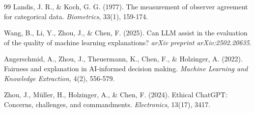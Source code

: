 \documentclass[sigconf,screen]{acmart}
\begin{document}
\begin{thebibliography}{99}
 Landis, J. R., \& Koch, G. G. (1977). The measurement of observer agreement for categorical data. \textit{Biometrics}, 33(1), 159-174.

 Wang, B., Li, Y., Zhou, J., \& Chen, F. (2025). Can LLM assist in the evaluation of the quality of machine learning explanations? \textit{arXiv preprint arXiv:2502.20635}.

 Angerschmid, A., Zhou, J., Theuermann, K., Chen, F., \& Holzinger, A. (2022). Fairness and explanation in AI-informed decision making. \textit{Machine Learning and Knowledge Extraction}, 4(2), 556-579.

 Zhou, J., M\"uller, H., Holzinger, A., \& Chen, F. (2024). Ethical ChatGPT: Concerns, challenges, and commandments. \textit{Electronics}, 13(17), 3417.

\end{thebibliography}
\end{document}
